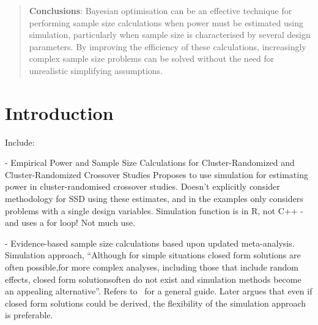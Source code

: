 \documentclass{article} %
\begin{document}
\begin{abstract}
\textbf{Conclusions}: Bayesian optimisation can be an effective technique for performing sample size calculations when power must be estimated using simulation, particularly when sample size is characterised by several design parameters. By improving the efficiency of these calculations, increasingly complex sample size problems can be solved without the need for unrealistic simplifying assumptions.
\end{abstract}

\section{Introduction}\label{sec:intro}

Include:

\cite{Reich2012} - Empirical Power and Sample Size Calculations for Cluster-Randomized and Cluster-Randomized Crossover Studies
Proposes to use simulation for estimating power in cluster-randomised crossover studies. Doesn't explicitly consider methodology for SSD using these estimates, and in the examples only considers problems with a single design variables. Simulation function is in R, not C++ - and uses a for loop! Not much use.

\cite{Sutton2007} - Evidence-based sample size calculations based upon updated meta-analysis. Simulation approach, ``Although for simple situations closed form solutions are often possible,for more complex analyses, including those that include random effects, closed form solutionsoften do not exist and simulation methods become an appealing alternative''. Refers to~\cite{Feiveson2002} for a general guide. Later argues that even if closed form solutions could be derived, the flexibility of the simulation approach is preferable.
\end{document}
